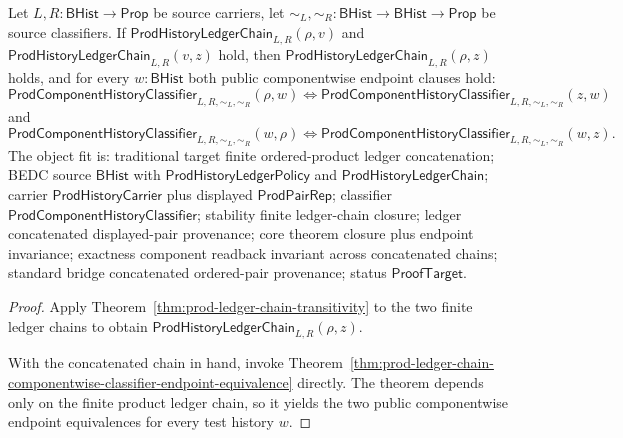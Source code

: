 \begin{theorem}
\label{thm:prod-ledger-chain-concatenation-componentwise-endpoints}
Let $L,R:\mathsf{BHist}\to\mathsf{Prop}$ be source carriers, let
$\sim_L,\sim_R:\mathsf{BHist}\to\mathsf{BHist}\to\mathsf{Prop}$ be source
classifiers. If
$\mathsf{ProdHistoryLedgerChain}_{L,R}(\rho,v)$ and
$\mathsf{ProdHistoryLedgerChain}_{L,R}(v,z)$ hold, then
$\mathsf{ProdHistoryLedgerChain}_{L,R}(\rho,z)$ holds, and for every
$w:\mathsf{BHist}$ both public componentwise endpoint clauses hold:
$$
\mathsf{ProdComponentHistoryClassifier}_{L,R,\sim_L,\sim_R}(\rho,w)
\Longleftrightarrow
\mathsf{ProdComponentHistoryClassifier}_{L,R,\sim_L,\sim_R}(z,w)
$$
and
$$
\mathsf{ProdComponentHistoryClassifier}_{L,R,\sim_L,\sim_R}(w,\rho)
\Longleftrightarrow
\mathsf{ProdComponentHistoryClassifier}_{L,R,\sim_L,\sim_R}(w,z).
$$
The object fit is: traditional target finite ordered-product ledger
concatenation; BEDC source $\mathsf{BHist}$ with
$\mathsf{ProdHistoryLedgerPolicy}$ and
$\mathsf{ProdHistoryLedgerChain}$; carrier $\mathsf{ProdHistoryCarrier}$ plus
displayed $\mathsf{ProdPairRep}$; classifier
$\mathsf{ProdComponentHistoryClassifier}$; stability finite ledger-chain
closure; ledger concatenated displayed-pair provenance; core theorem closure
plus endpoint invariance; exactness component readback invariant across
concatenated chains; standard bridge concatenated ordered-pair provenance;
status $\mathsf{ProofTarget}$.
\end{theorem}
\begin{proof}
Apply Theorem~\ref{thm:prod-ledger-chain-transitivity} to the two finite
ledger chains to obtain
$\mathsf{ProdHistoryLedgerChain}_{L,R}(\rho,z)$.

With the concatenated chain in hand, invoke
Theorem~\ref{thm:prod-ledger-chain-componentwise-classifier-endpoint-equivalence}
directly. The theorem depends only on the finite product ledger chain, so it
yields the two public componentwise endpoint equivalences for every test
history $w$.
\end{proof}

